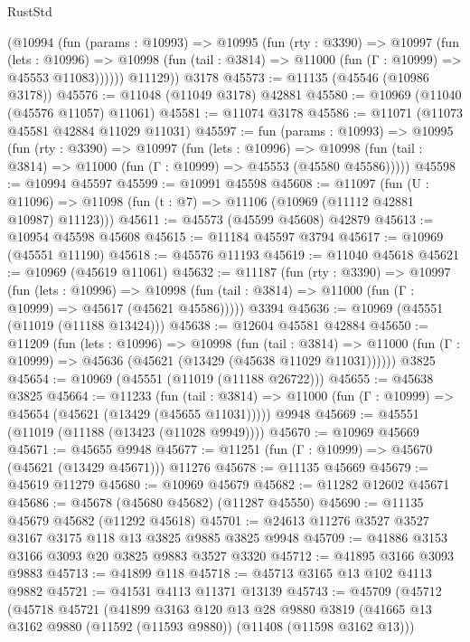\begin{lexlean}{RustStd}
\begin{coremodule}
        (@10994
          (fun (params : @10993) =>
          @10995
            (fun (rty : @3390) =>
            @10997
              (fun (lets : @10996) =>
              @10998 (fun (tail : @3814) => @11000 (fun (Γ : @10999) => @45553 @11083))))))
        @11129))
    @3178
@45573 := @11135 (@45546 (@10986 @3178))
@45576 := @11048 (@11049 @3178) @42881
@45580 := @10969 (@11040 (@45576 @11057) @11061)
@45581 := @11074 @3178
@45586 := @11071 (@11073 @45581 @42884 @11029 @11031)
@45597 := fun (params : @10993) =>
  @10995
    (fun (rty : @3390) =>
    @10997
      (fun (lets : @10996) =>
      @10998 (fun (tail : @3814) => @11000 (fun (Γ : @10999) => @45553 (@45580 @45586)))))
@45598 := @10994 @45597
@45599 := @10991 @45598
@45608 := @11097
    (fun (U : @11096) => @11098 (fun (t : @7) => @11106 (@10969 (@11112 @42881 @10987) @11123)))
@45611 := @45573 (@45599 @45608) @42879
@45613 := @10954 @45598 @45608
@45615 := @11184 @45597 @3794
@45617 := @10969 (@45551 @11190)
@45618 := @45576 @11193
@45619 := @11040 @45618
@45621 := @10969 (@45619 @11061)
@45632 := @11187
    (fun (rty : @3390) =>
    @10997
      (fun (lets : @10996) =>
      @10998 (fun (tail : @3814) => @11000 (fun (Γ : @10999) => @45617 (@45621 @45586)))))
    @3394
@45636 := @10969 (@45551 (@11019 (@11188 @13424)))
@45638 := @12604 @45581 @42884
@45650 := @11209
    (fun (lets : @10996) =>
    @10998
      (fun (tail : @3814) =>
      @11000 (fun (Γ : @10999) => @45636 (@45621 (@13429 (@45638 @11029 @11031))))))
    @3825
@45654 := @10969 (@45551 (@11019 (@11188 @26722)))
@45655 := @45638 @3825
@45664 := @11233
    (fun (tail : @3814) => @11000 (fun (Γ : @10999) => @45654 (@45621 (@13429 (@45655 @11031)))))
    @9948
@45669 := @45551 (@11019 (@11188 (@13423 (@11028 @9949))))
@45670 := @10969 @45669
@45671 := @45655 @9948
@45677 := @11251 (fun (Γ : @10999) => @45670 (@45621 (@13429 @45671))) @11276
@45678 := @11135 @45669
@45679 := @45619 @11279
@45680 := @10969 @45679
@45682 := @11282 @12602 @45671
@45686 := @45678 (@45680 @45682) (@11287 @45550)
@45690 := @11135 @45679 @45682 (@11292 @45618)
@45701 := @24613 @11276 @3527 @3527 @3167 @3175 @118 @13 @3825 @9885 @3825 @9948
@45709 := @41886 @3153 @3166 @3093 @20 @3825 @9883 @3527 @3320
@45712 := @41895 @3166 @3093 @9883
@45713 := @41899 @118
@45718 := @45713 @3165 @13 @102 @4113 @9882
@45721 := @41531 @4113 @11371 @13139
@45743 := @45709
    (@45712
      (@45718
        @45721
        (@41899
          @3163
          @120
          @13
          @28
          @9880
          @3819
          (@41665 @13 @3162 @9880 (@11592 (@11593 @9880)) (@11408 (@11598 @3162 @13)))

\end{coremodule}
\end{lexlean}

